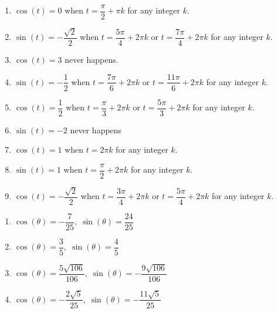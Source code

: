 \documentclass{ximera}
\begin{document}
\begin{enumerate}

\setcounter{enumi}{\value{HW}}

\item $\cos(t) = 0$ when $t = \dfrac{\pi}{2} + \pi k$ for any integer $k$.
\item $\sin(t) = -\dfrac{\sqrt{2}}{2}$ when $t = \dfrac{5\pi}{4} + 2\pi k$ or $t = \dfrac{7\pi}{4} + 2\pi k$ for any integer $k$.
\item $\cos(t) = 3$ never happens.  
\item $\sin(t) = -\dfrac{1}{2}$ when $t = \dfrac{7\pi}{6} + 2\pi k$ or $t = \dfrac{11\pi}{6} + 2\pi k$ for any integer $k$.
\item $\cos(t) = \dfrac{1}{2}$ when $t = \dfrac{\pi}{3} + 2\pi k$ or $t = \dfrac{5\pi}{3} + 2\pi k$ for any integer $k$.
\item $\sin(t) = -2$ never happens
\item $\cos(t) = 1$ when $t = 2\pi k$ for any integer $k$.
\item $\sin(t) = 1$ when $t = \dfrac{\pi}{2} + 2\pi k$ for any integer $k$.
\item $\cos(t) = -\dfrac{\sqrt{2}}{2}$ when $t = \dfrac{3\pi}{4} + 2\pi k$ or $t = \dfrac{5\pi}{4} + 2\pi k$ for any integer $k$.

\setcounter{HW}{\value{enumi}}

\end{enumerate}

\begin{enumerate}

\setcounter{enumi}{\value{HW}}

\item $\cos(\theta) = -\dfrac{7}{25}, \; \sin(\theta) = \dfrac{24}{25}$

\item $\cos(\theta) = \dfrac{3}{5}, \; \sin(\theta) = \dfrac{4}{5}$

\item $\cos(\theta) = \dfrac{5\sqrt{106}}{106}, \; \sin(\theta) = -\dfrac{9\sqrt{106}}{106}$

\item $\cos(\theta) = -\dfrac{2\sqrt{5}}{25}, \; \sin(\theta) = -\dfrac{11\sqrt{5}}{25}$

\setcounter{HW}{\value{enumi}}

\end{enumerate}
\end{document}

